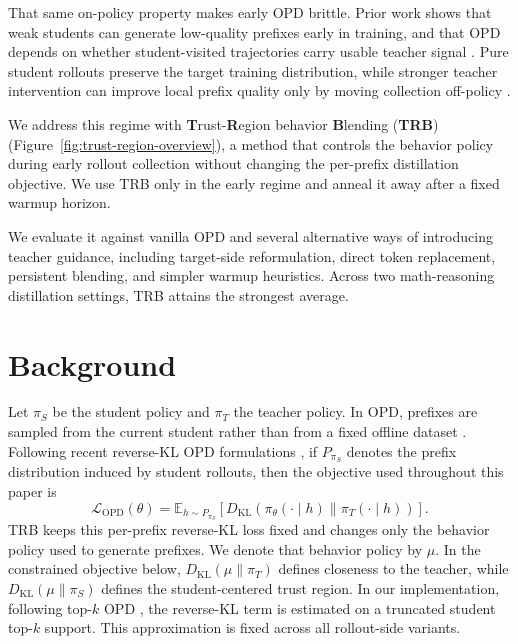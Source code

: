 \documentclass[11pt]{article}
\begin{document}
That same on-policy property makes early OPD brittle. Prior work shows that weak students can generate low-quality prefixes early in training, and that OPD depends on whether student-visited trajectories carry usable teacher signal \citep{skd,li2026rethinking}. Pure student rollouts preserve the target training distribution, while stronger teacher intervention can improve local prefix quality only by moving collection off-policy \citep{skd,li2026rethinking}.

We address this regime with \textbf{T}rust-\textbf{R}egion behavior \textbf{B}lending (\textbf{TRB}) (Figure~\ref{fig:trust-region-overview}), a method that controls the behavior policy during early rollout collection without changing the per-prefix distillation objective. We use TRB only in the early regime and anneal it away after a fixed warmup horizon.

We evaluate it against vanilla OPD and several alternative ways of introducing teacher guidance, including target-side reformulation, direct token replacement, persistent blending, and simpler warmup heuristics. Across two math-reasoning distillation settings, TRB attains the strongest average.

\section{Background}
\label{sec:background}

Let $\pi_S$ be the student policy and $\pi_T$ the teacher policy.
In OPD, prefixes are sampled from the current student rather than from a fixed offline dataset \citep{opd,li2026rethinking}. Following recent reverse-KL OPD formulations \citep{gu2023minillm,veto,jin2026entropyaware,li2026rethinking}, if $P_{\pi_S}$ denotes the prefix distribution induced by student rollouts, then the objective used throughout this paper is
\begin{equation*}
\mathcal{L}_{\mathrm{OPD}}(\theta)
=
\mathbb{E}_{h \sim P_{\pi_S}}
\left[
D_{\mathrm{KL}}(\pi_\theta(\cdot\mid h)\|\pi_T(\cdot\mid h))
\right].
\end{equation*}
TRB keeps this per-prefix reverse-KL loss fixed and changes only the behavior policy used to generate prefixes. We denote that behavior policy by $\mu$. In the constrained objective below, $D_{\mathrm{KL}}(\mu\|\pi_T)$ defines closeness to the teacher, while $D_{\mathrm{KL}}(\mu\|\pi_S)$ defines the student-centered trust region. In our implementation, following top-$k$ OPD \citep{li2026rethinking}, the reverse-KL term is estimated on a truncated student top-$k$ support. This approximation is fixed across all rollout-side variants.
\end{document}
